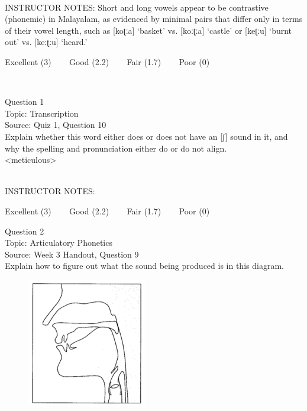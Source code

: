 \documentclass[12pt]{article}
\begin{document}
~\\
INSTRUCTOR NOTES: Short and long vowels appear to be contrastive (phonemic) in Malayalam, as evidenced by minimal pairs that differ only in terms of their vowel length, such as [koʈːa] ‘basket’ vs. [koːʈːa] ‘castle’ or [keʈːu] ‘burnt out’ vs. [keːʈːu] ‘heard.’


\vfill
Excellent (3) ~~~ Good (2.2) ~~~ Fair (1.7) ~~~ Poor (0)
\newpage

\begin{center}
\textbf{{\color{red}{\HUGE END OF EXAM}}}\\

\end{center}
\newpage

\begin{center}
\textbf{{\color{blue}{\HUGE START OF EXAM\\}}}

\textbf{{\color{blue}{\HUGE Student ID: 94988\\}}}

\textbf{{\color{blue}{\HUGE \\}}}

\end{center}
\newpage

{\large Question 1}\\

Topic: Transcription\\
Source: Quiz 1, Question 10\\

Explain whether this word either does or does not have an [ʃ] sound in it, and why the spelling and pronunciation either do or do not align.\\

<meticulous>


~\\
INSTRUCTOR NOTES: 


\vfill
Excellent (3) ~~~ Good (2.2) ~~~ Fair (1.7) ~~~ Poor (0)
\newpage

{\large Question 2}\\

Topic: Articulatory Phonetics\\
Source: Week 3 Handout, Question 9\\

Explain how to figure out what the sound being produced is in this diagram.\\

\begin{figure}[H]
\includegraphics{../images/sagittal_k.png}
\end{figure}
\end{document}
